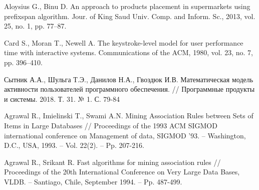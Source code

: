 \begin{thebibliography}{1}
	Aloysius G., Binu D.
	An approach to products placement in supermarkets using prefixspan algorithm.
	Jour. of King Saud Univ. Comp. and Inform. Sc., 2013, vol. 25, no. 1, pp. 77–87.
	
	Card S., Moran T., Newell A.
	The keystroke-level model for user performance time with interactive systems.
	Communications of the ACM, 1980, vol. 23, no. 7, pp. 396–410.
	
	Сытник А.А., Шульга Т.Э., Данилов Н.А., Гвоздюк И.В.
	Математическая модель активности пользователей программного обеспечения.
	// Программные продукты и системы. 2018. Т. 31. № 1. С. 79-84 
	
	Agrawal R., Imielinski T., Swami A.N.
	Mining Association Rules between Sets of Items in Large Databases
	// Proceedings of the 1993 ACM SIGMOD international conference on Management of data, SIGMOD '93. – Washington, D.C., USA, 1993. – Vol. 22(2). – Pp. 207-216.
	
	Agrawal R., Srikant R.
	Fast algorithms for mining association rules
	// Proceedings of the 20th International Conference on Very Large Data Bases, VLDB. – Santiago, Chile, September 1994. – Pp. 487-499.
	
	
\end{thebibliography}
